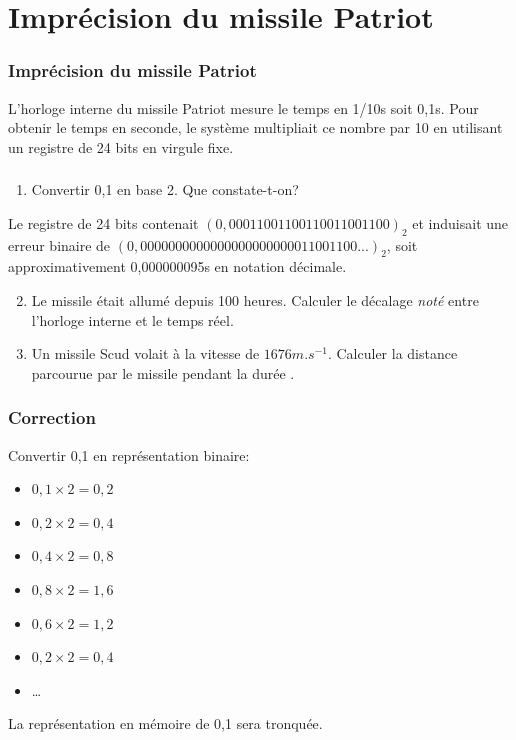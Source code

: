 \documentclass[svgnames,11pt]{beamer}
\begin{document}
\section{Imprécision du missile Patriot}
\begin{frame}
    \frametitle{Imprécision du missile Patriot}

    L’horloge interne du missile Patriot mesure le temps en 1/10s soit 0,1s. Pour obtenir le temps en seconde, le système multipliait ce nombre par 10 en utilisant un registre de 24 bits en virgule fixe. 

\end{frame}
\begin{frame}
    \frametitle{}

    \begin{activite}
        \begin{enumerate}
        \item Convertir 0,1 en base 2. Que constate-t-on?
        \end{enumerate}
        Le registre de 24 bits contenait $(0,00011001100110011001100)_2$ et induisait une erreur binaire de $(0,0000000000000000000000011001100...)_2$, soit approximativement 0,000000095s en notation décimale.
        \begin{enumerate}
            \setcounter{enumi}{1}
        \item Le missile était allumé depuis 100 heures. Calculer le décalage \emph{noté \varepsilon} entre l'horloge interne et le temps réel.
        \item Un missile Scud volait à la vitesse de $1676m.s^{-1}$. Calculer la distance parcourue par le missile pendant la durée \varepsilon.
        \end{enumerate}
    \end{activite}
\end{frame}
\begin{frame}
    \frametitle{Correction}
    Convertir 0,1 en représentation binaire:
    \begin{itemize}
        \item $0,1×2 = 0,2$
        \item $0,2×2 = 0,4$
        \item $0,4×2=0,8$
        \item $0,8×2=1,6$
        \item $0,6×2=1,2$
        \item $0,2×2 = 0,4$
        \item \dots
    \end{itemize}
La représentation en mémoire de 0,1 sera tronquée.

\end{frame}
\end{document}

